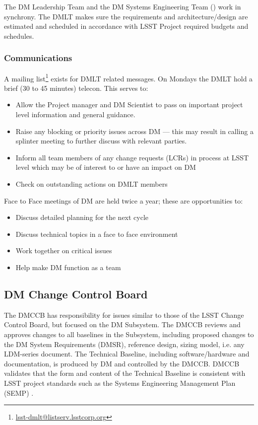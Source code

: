 The DM Leadership Team and the DM Systems Engineering Team () work in synchrony.
The DMLT makes sure the requirements and architecture/design are estimated and scheduled in accordance with LSST Project required budgets and schedules.

 \subsubsection{Communications}
A mailing list\footnote{\url{lsst-dmlt@listserv.lsstcorp.org}} exists for DMLT related messages.
On Mondays the DMLT hold a brief (30 to 45 minutes) telecon. This serves to:

\begin{itemize}
\item Allow the Project manager and DM Scientist  to pass on important project level information and general guidance.
\item Raise any blocking or priority issues across DM --- this may result in calling a splinter meeting to further discuss with relevant parties.
\item Inform all team members of any change requests (LCRs) in process at LSST level which may be of interest to or have an impact on DM
\item Check on outstanding actions on DMLT members
\end{itemize}

Face to Face meetings of DM are held twice a year; these are opportunities to:

\begin{itemize}
\item Discuss detailed planning for the next cycle
\item Discuss technical topics in a face to face environment
\item Work together on critical issues
\item Help make DM function as a team
\end{itemize}

\subsection{DM Change Control Board \label{sect:dmccb}}

The DMCCB has responsibility for issues similar to those of the LSST Change Control Board, but focused on the DM Subsystem.
The DMCCB reviews and approves changes to all baselines in the Subsystem, including proposed changes to the DM System Requirements (DMSR), reference design, sizing model, i.e. any LDM-series document.
The Technical Baseline, including software/hardware and documentation, is produced by DM and controlled by the DMCCB.
DMCCB validates that the form and content of the Technical Baseline is consistent with LSST project standards such as the Systems Engineering Management Plan (SEMP) .

